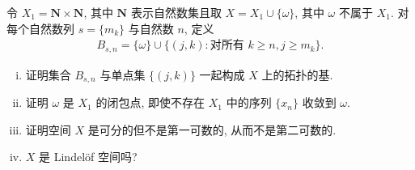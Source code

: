 \documentclass[../../main.tex]{subfiles}
\begin{document}
\begin{exercise}\label{exercise:ch11-22}
令 $X_{1}=\mathbf{N}\times\mathbf{N}$, 其中 $\mathbf{N}$ 表示自然数集且取 $X=X_{1}\cup\{\omega\}$, 其中 $\omega$ 不属于 $X_{1}$. 对每个自然数列 $s=\{m_{k}\}$ 与自然数 $n$, 定义
\begin{align*}
B_{s,n}=\{\omega\}\cup\{(j,k):\text{对所有 }k\geqslant n,j\geqslant m_{k}\}.
\end{align*}
\begin{enumerate}[(i)]
\item 证明集合 $B_{s,n}$ 与单点集 $\{(j,k)\}$ 一起构成 $X$ 上的拓扑的基.
\item 证明 $\omega$ 是 $X_{1}$ 的闭包点, 即使不存在 $X_{1}$ 中的序列 $\{x_{n}\}$ 收敛到 $\omega$.
\item 证明空间 $X$ 是可分的但不是第一可数的, 从而不是第二可数的.
\item $X$ 是 Lindel\"of 空间吗?
\end{enumerate}
\end{exercise}
\end{document}
